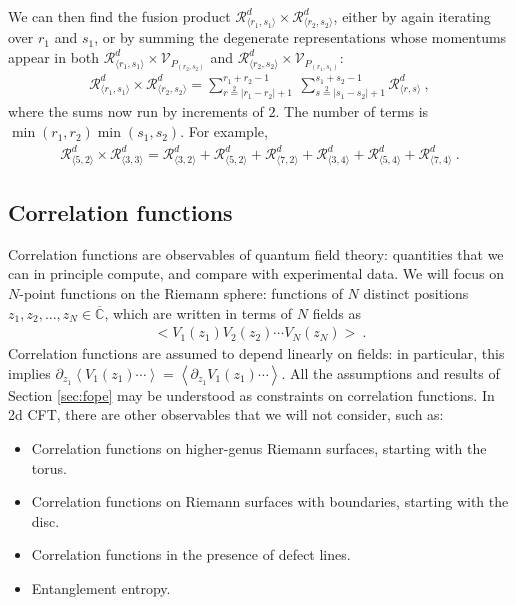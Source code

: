 \documentclass[12pt, a4paper]{article}
\begin{document}
We can then find the fusion product $\mathcal{R}^d_{\langle r_1,s_1\rangle}\times \mathcal{R}^d_{\langle r_2,s_2\rangle}$, either by again iterating over $r_1$ and $s_1$, or by summing the degenerate representations whose momentums appear in both  $\mathcal{R}^d_{\langle r_1,s_1\rangle}\times \mathcal{V}_{P_{(r_2,s_2)}}$ and $\mathcal{R}^d_{\langle r_2,s_2\rangle}\times \mathcal{V}_{P_{(r_1,s_1)}}$:
\begin{align}
  \boxed{\mathcal{R}^d_{\langle r_1,s_1 \rangle} \times \mathcal{R}^d_{\langle r_2,s_2 \rangle} = \sum_{r\overset{2}{=}|r_1-r_2|+1}^{r_1+r_2-1}\ \sum_{s\overset{2}{=}|s_1-s_2|+1}^{s_1+s_2-1} \mathcal{R}^d_{\langle r,s \rangle}}\ ,
  \label{rrsr}
\end{align}
where the sums now run by increments of $2$. The number of terms is $\min(r_1,r_2)\min(s_1,s_2)$. For example,
\begin{align}
 \mathcal{R}^d_{\langle 5,2\rangle}\times \mathcal{R}^d_{\langle 3,3\rangle} = \mathcal{R}^d_{\langle 3,2\rangle} + \mathcal{R}^d_{\langle 5, 2\rangle} + \mathcal{R}^d_{\langle 7,2\rangle} +\mathcal{R}^d_{\langle 3,4\rangle}+\mathcal{R}^d_{\langle 5,4\rangle} + \mathcal{R}^d_{\langle 7,4\rangle} \ .
\end{align}



\subsection{Correlation functions}\label{sec:cor}

Correlation functions are observables of quantum field theory: quantities that we can in principle compute, and compare with experimental data. We will focus on $N$-point functions on the Riemann sphere: functions of $N$ distinct positions $z_1,z_2,\dots, z_N\in \overline{\mathbb{C}}$, which are written in terms of $N$ fields as 
\begin{align}
 \Big< V_1(z_1) V_2(z_2) \cdots V_N(z_N)\Big>\ . 
\end{align}
Correlation functions are assumed to depend linearly on fields: in particular, this implies $\partial_{z_1}\left<  V_1(z_1) \cdots \right> = \left< \partial_{z_1} V_1(z_1) \cdots \right>$.
All the assumptions and results of Section \ref{sec:fope} may be understood as constraints on correlation functions. 
In 2d CFT, there are other observables that we will not consider, such as: 
\begin{itemize}
 \item Correlation functions on higher-genus Riemann surfaces, starting with the torus. 
 \item Correlation functions on Riemann surfaces with boundaries, starting with the disc. 
 \item Correlation functions in the presence of defect lines. 
 \item Entanglement entropy. 
\end{itemize}
\end{document}
